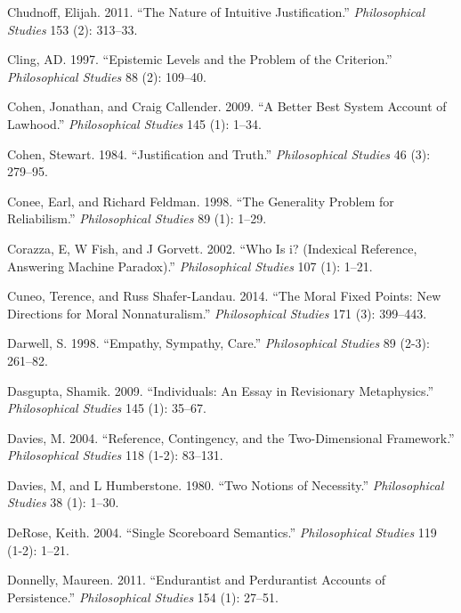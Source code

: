 \documentclass[
  10pt,
  letterpaper,
  DIV=11,
  numbers=noendperiod,
  twoside]{scrartcl}
\newlength{\cslhangindent}
\newenvironment{CSLReferences}[2] %
 {\begin{list}{}{%
  \setlength{\itemindent}{0pt}
  \setlength{\leftmargin}{0pt}
  \setlength{\parsep}{0pt}
  \ifodd #1
   \setlength{\leftmargin}{\cslhangindent}
   \setlength{\itemindent}{-1\cslhangindent}
  \fi
  \setlength{\itemsep}{#2\baselineskip}}}
 {\end{list}}
\begin{document}
\begin{CSLReferences}{1}{0}
Chudnoff, Elijah. 2011. {``The Nature of Intuitive Justification.''}
\emph{Philosophical Studies} 153 (2): 313--33.

Cling, AD. 1997. {``Epistemic Levels and the Problem of the
Criterion.''} \emph{Philosophical Studies} 88 (2): 109--40.

Cohen, Jonathan, and Craig Callender. 2009. {``A Better Best System
Account of Lawhood.''} \emph{Philosophical Studies} 145 (1): 1--34.

Cohen, Stewart. 1984. {``Justification and Truth.''} \emph{Philosophical
Studies} 46 (3): 279--95.

Conee, Earl, and Richard Feldman. 1998. {``The Generality Problem for
Reliabilism.''} \emph{Philosophical Studies} 89 (1): 1--29.

Corazza, E, W Fish, and J Gorvett. 2002. {``Who Is i? (Indexical
Reference, Answering Machine Paradox).''} \emph{Philosophical Studies}
107 (1): 1--21.

Cuneo, Terence, and Russ Shafer-Landau. 2014. {``The Moral Fixed Points:
New Directions for Moral Nonnaturalism.''} \emph{Philosophical Studies}
171 (3): 399--443.

Darwell, S. 1998. {``Empathy, Sympathy, Care.''} \emph{Philosophical
Studies} 89 (2-3): 261--82.

Dasgupta, Shamik. 2009. {``Individuals: An Essay in Revisionary
Metaphysics.''} \emph{Philosophical Studies} 145 (1): 35--67.

Davies, M. 2004. {``Reference, Contingency, and the Two-Dimensional
Framework.''} \emph{Philosophical Studies} 118 (1-2): 83--131.

Davies, M, and L Humberstone. 1980. {``Two Notions of Necessity.''}
\emph{Philosophical Studies} 38 (1): 1--30.

DeRose, Keith. 2004. {``Single Scoreboard Semantics.''}
\emph{Philosophical Studies} 119 (1-2): 1--21.

Donnelly, Maureen. 2011. {``Endurantist and Perdurantist Accounts of
Persistence.''} \emph{Philosophical Studies} 154 (1): 27--51.


\end{CSLReferences}
\end{document}
